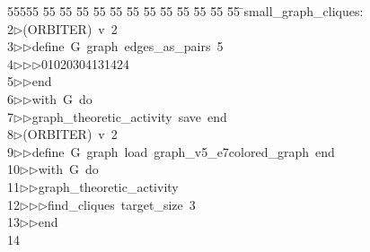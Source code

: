 %
%
\begin{tabbing}
55555 \= 55 \= 55 \= 55 \= 55 \= 55 \= 55 \= 55 \= 55 \= 55 \= 55 \= 55 \= 55 \= \>small\_graph\_cliques:\ \\[0pt]
2\>$\triangleright$\>(ORBITER)\ v\ 2\ \\[0pt]
3\>$\triangleright$\>$\triangleright$\>define\ G\ graph\ edges\_as\_pairs\ 5\ \\[0pt]
4\>$\triangleright$\>$\triangleright$\>$\triangleright$\>01020304131424\ \\[0pt]
5\>$\triangleright$\>$\triangleright$\>end\ \\[0pt]
6\>$\triangleright$\>$\triangleright$\>with\ G\ do\ \\[0pt]
7\>$\triangleright$\>$\triangleright$\>graph\_theoretic\_activity\ save\ end\\[0pt]
8\>$\triangleright$\>(ORBITER)\ v\ 2\ \\[0pt]
9\>$\triangleright$\>$\triangleright$\>define\ G\ graph\ load\ graph\_v5\_e7colored\_graph\ end\ \\[0pt]
10\>$\triangleright$\>$\triangleright$\>with\ G\ do\ \\[0pt]
11\>$\triangleright$\>$\triangleright$\>graph\_theoretic\_activity\ \\[0pt]
12\>$\triangleright$\>$\triangleright$\>$\triangleright$\>find\_cliques\ target\_size\ 3\ \\[0pt]
13\>$\triangleright$\>$\triangleright$\>end\\[0pt]
14\>\end{tabbing}
